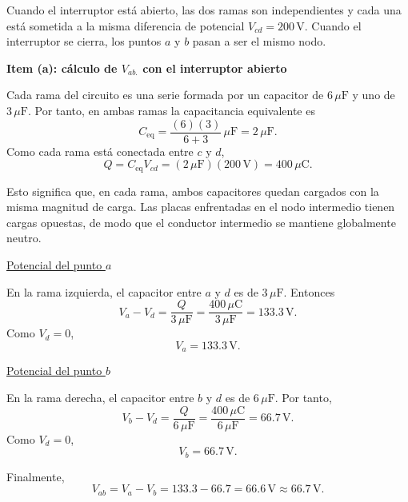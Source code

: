 \documentclass[11pt]{article}
\begin{document}
Cuando el interruptor est\'a abierto, las dos ramas son independientes y cada una est\'a sometida a la misma diferencia de potencial $V_{cd}=200\,\text{V}$. Cuando el interruptor se cierra, los puntos $a$ y $b$ pasan a ser el mismo nodo.

\textbf{Item (a): c\'alculo de $V_{ab.}$ con el interruptor abierto}

Cada rama del circuito es una serie formada por un capacitor de $6\,\mu\text{F}$ y uno de $3\,\mu\text{F}$. Por tanto, en ambas ramas la capacitancia equivalente es
\begin{equation*}
    C_{\text{eq}}=\frac{(6)(3)}{6+3}\,\mu\text{F}=2\,\mu\text{F}.
\end{equation*}
Como cada rama est\'a conectada entre $c$ y $d$,
\begin{equation*}
    Q=C_{\text{eq}}V_{cd}=(2\,\mu\text{F})(200\,\text{V})=400\,\mu\text{C}.
\end{equation*}

Esto significa que, en cada rama, ambos capacitores quedan cargados con la misma magnitud de carga. Las placas enfrentadas en el nodo intermedio tienen cargas opuestas, de modo que el conductor intermedio se mantiene globalmente neutro.

\medskip
\underline{Potencial del punto $a$}

En la rama izquierda, el capacitor entre $a$ y $d$ es de $3\,\mu\text{F}$. Entonces
\begin{equation*}
    V_a-V_d=\frac{Q}{3\,\mu\text{F}}=\frac{400\,\mu\text{C}}{3\,\mu\text{F}}=133.3\,\text{V}.
\end{equation*}
Como $V_d=0$,
\begin{equation*}
    V_a=133.3\,\text{V}.
\end{equation*}

\underline{Potencial del punto $b$}

En la rama derecha, el capacitor entre $b$ y $d$ es de $6\,\mu\text{F}$. Por tanto,
\begin{equation*}
    V_b-V_d=\frac{Q}{6\,\mu\text{F}}=\frac{400\,\mu\text{C}}{6\,\mu\text{F}}=66.7\,\text{V}.
\end{equation*}
Como $V_d=0$,
\begin{equation*}
    V_b=66.7\,\text{V}.
\end{equation*}

Finalmente,
\begin{equation*}
    V_{ab}=V_a-V_b=133.3-66.7=66.6\,\text{V}\approx 66.7\,\text{V}.
\end{equation*}
\end{document}
